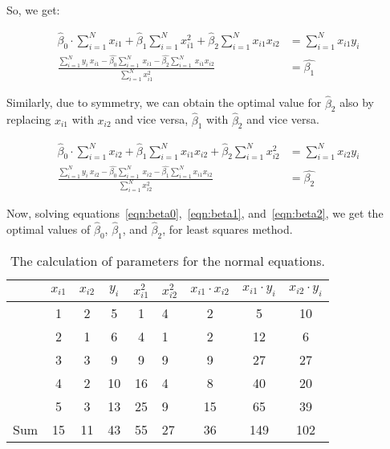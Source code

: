 \documentclass{article}
\begin{document}
So, we get:

\begin{equation}
    \label{eqn:beta1}
    \begin{split}
      \hat{\beta}_0 \cdot \sum_{i=1}^N x_{i1} + \hat{\beta}_1 \sum_{i=1}^N x_{i1}^2 + \hat{\beta}_2 \sum_{i=1}^N x_{i1} x_{i2} &= \sum_{i=1}^N x_{i1} y_i \\
      \frac{\sum_{i=1}^{N} y_i~x_{i1} - \hat{\beta_0}\sum_{i=1}^{N}~x_{i1} - \hat{\beta_2}\sum_{i=1}^{N}~x_{i1}x_{i2}}{\sum_{i=1}^{N}x_{i1}^2} &= \hat{\beta_1} 
    \end{split}
\end{equation}

Similarly, due to symmetry, we can obtain the optimal value for $\hat{\beta}_2$ also by replacing $x_{i1}$ with $x_{i2}$ and vice versa, $\hat{\beta}_1$ with $\hat{\beta}_2$ and vice versa.

\begin{equation}
    \label{eqn:beta2}
    \begin{split}
      \hat{\beta}_0 \cdot \sum_{i=1}^N x_{i2} + \hat{\beta}_1 \sum_{i=1}^N x_{i1} x_{i2} + \hat{\beta}_2 \sum_{i=1}^N x_{i2}^2 &= \sum_{i=1}^N x_{i2} y_i \\
      \frac{\sum_{i=1}^{N} y_i~x_{i2} - \hat{\beta_0}\sum_{i=1}^{N}~x_{i2} - \hat{\beta_1}\sum_{i=1}^{N}x_{i1}x_{i2}}{\sum_{i=1}^{N}x_{i2}^2} &= \hat{\beta_2}       
    \end{split}
\end{equation}

Now, solving equations~\ref{eqn:beta0},~\ref{eqn:beta1}, and~\ref{eqn:beta2}, we get the optimal values of $\hat{\beta}_0$, $\hat{\beta}_1$, and $\hat{\beta}_2$, for least squares method.

\begin{table}[h!]
  \centering
  \caption{The calculation of parameters for the normal equations.}
  \label{tab:caclulation}
  \begin{tabular}{l|cccclccc}
      \hline
       & $x_{i1}$ & $x_{i2}$ & $y_i$ & $x_{i1}^2$ & $x_{i2}^2$ & $x_{i1} \cdot x_{i2}$ & $x_{i1} \cdot y_i$ & $x_{i2} \cdot y_i$ \\
       \hline
          & 1  & 2  & 5  & 1  & 4  & 2  & 5  & 10  \\
          & 2  & 1  & 6  & 4  & 1  & 2  & 12 & 6   \\
          & 3  & 3  & 9  & 9  & 9  & 9  & 27 & 27  \\
          & 4  & 2  & 10 & 16 & 4  & 8  & 40 & 20  \\
          & 5  & 3  & 13 & 25 & 9  & 15 & 65 & 39  \\
      \hline
      Sum & 15 & 11 & 43 & 55 & 27 & 36 & 149 & 102
  \end{tabular}
\end{table}
\end{document}

